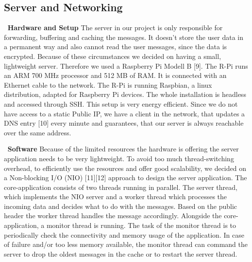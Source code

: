 \documentclass{report}
\begin{document}
\subsection{Server and Networking}

\vspace{-1mm}
$\:$\newline
\textbf{Hardware and Setup}\newline
\indent The server in our project is only responsible for forwarding, buffering and caching the messages. It doesn't store the user data in a permanent way and also cannot read the user messages, since the data is encrypted. 
Because of these circumstances we decided on having a small, lightweight server. Therefore we used a Raspberry Pi Modell B [9]. The R-Pi runs an ARM 700 MHz processor and 512 MB of RAM. It is connected with an Ethernet cable to the network.
The R-Pi is running Raspbian, a linux distribution, adapted for Raspberry Pi devices. The whole installation is headless and accessed through SSH. This setup is very energy efficient. 
Since we do not have access to a static Public IP, we have a client in the network, that updates a DNS entry [10] every minute and guarantees, that our server is always reachable over the same address. 

\vspace{-2mm}
$\:$\newline
\textbf{Software}\newline
\indent Because of the limited resources the hardware is offering the server application needs to be very lightweight. To avoid too much thread-switching overhead, to efficiently use the resources and offer good scalability, we decided on a Non-blocking I/O (NIO) [11][12] approach to design the server application. The core-application consists of two threads running in parallel. The server thread, which implements the NIO server and a worker thread which processes the incoming data and decides what to do with the messages. Based on the public header the worker thread handles the message accordingly.
Alongside the core-application, a monitor thread is running. The task of the monitor thread is to periodically check the connectivity and memory usage of the application. In case of failure and/or too less memory available, the monitor thread can command the server to drop the oldest messages in the cache or to restart the server thread. 
\end{document}
